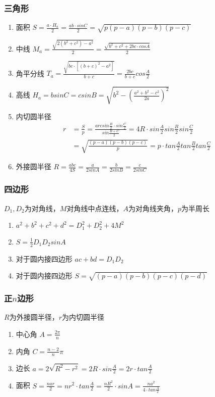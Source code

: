 \documentclass[landscape,twocolumn,a4paper]{article}
\begin{document}
	\subsubsection*{三角形}

	\begin{enumerate}
		\item 面积
		$S=\frac{a \cdot H_a}{2}=\frac{ab \cdot sinC}{2}=\sqrt{p(p-a)(p-b)(p-c)}$
		\item 中线
		$M_a=\frac{\sqrt{2(b^2+c^2)-a^2}}{2}=\frac{\sqrt{b^2+c^2+2bc \cdot cosA}}{2}$
		\item 角平分线
		$T_a=\frac{\sqrt{bc \cdot [(b+c)^2-a^2]}}{b+c}=\frac{2bc}{b+c}cos\frac{A}{2}$
		\item 高线
		$H_a=bsinC=csinB=\sqrt{b^2-(\frac{a^2+b^2-c^2}{2a})^2}$
		\item 内切圆半径
		\begin{align*}
		r&=\frac{S}{p}=\frac{arcsin\frac{B}{2} \cdot sin\frac{C}{2}}{sin\frac{B+C}{2}}=4R \cdot sin\frac{A}{2}sin\frac{B}{2}sin\frac{C}{2}\\
		&=\sqrt{\frac{(p-a)(p-b)(p-c)}{p}}=p \cdot tan\frac{A}{2}tan\frac{B}{2}tan\frac{C}{2}
		\end{align*}
		\item 外接圆半径
		$R=\frac{abc}{4S}=\frac{a}{2sinA}=\frac{b}{2sinB}=\frac{c}{2sinC}$
	\end{enumerate}

	\subsubsection*{四边形}

	$D_1, D_2$为对角线，$M$对角线中点连线，$A$为对角线夹角，$p$为半周长
	\begin{enumerate}
		\item $a^2+b^2+c^2+d^2=D_1^2+D_2^2+4M^2$
		\item $S=\frac{1}{2}D_1D_2sinA$
		\item 对于圆内接四边形
		$ac+bd=D_1D_2$
		\item 对于圆内接四边形
		$S=\sqrt{(p-a)(p-b)(p-c)(p-d)}$
	\end{enumerate}

	\subsubsection*{正$n$边形}

	$R$为外接圆半径，$r$为内切圆半径
	\begin{enumerate}
		\item 中心角
		$A=\frac{2\pi}{n}$
		\item 内角
		$C=\frac{n-2}{n}\pi$
		\item 边长
		$a=2\sqrt{R^2-r^2}=2R \cdot sin\frac{A}{2}=2r \cdot tan\frac{A}{2}$
		\item 面积
		$S=\frac{nar}{2}=nr^2 \cdot tan\frac{A}{2}=\frac{nR^2}{2} \cdot sinA=\frac{na^2}{4 \cdot tan\frac{A}{2}}$
	\end{enumerate}
\end{document}
